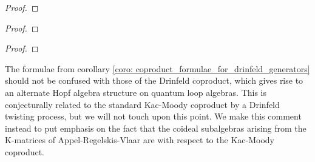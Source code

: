         \begin{lemma} \label{lemma: drinfeld_current_presentation_for_loop_QUEs}
        \end{lemma}
            \begin{proof}
                
            \end{proof}
        \begin{corollary} \label{coro: triangular_decomposition_for_loop_QUEs}
            
        \end{corollary}
            \begin{proof}
                
            \end{proof}
        \begin{corollary} \label{coro: coproduct_formulae_for_drinfeld_generators}
            
        \end{corollary}
            \begin{proof}
                
            \end{proof}
        \begin{remark}
            The formulae from corollary \ref{coro: coproduct_formulae_for_drinfeld_generators} should not be confused with those of the Drinfeld coproduct, which gives rise to an alternate Hopf algebra structure on quantum loop algebras. This is conjecturally related to the standard Kac-Moody coproduct by a Drinfeld twisting process, but we will not touch upon this point. We make this comment instead to put emphasis on the fact that the coideal subalgebras arising from the K-matrices of Appel-Regelskis-Vlaar are with respect to the Kac-Moody coproduct. 
        \end{remark}
            
